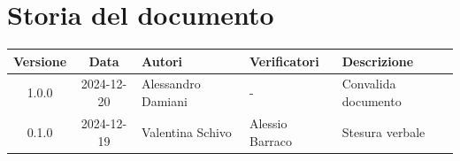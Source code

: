 \section*{Storia del documento}
\begin{tabularx}{\textwidth}{ c c p{2.75cm} p{2.75cm} X }
    \rowcolor{gray!20}\rule{0pt}{0.5cm}\textbf{Versione} & \textbf{Data} & \textbf{Autori} & \textbf{Verificatori} & \textbf{Descrizione} \\[0.7ex]
    \hline
    \rule{0pt}{0.5cm}1.0.0 & 2024-12-20 & Alessandro Damiani & - & Convalida documento\\[0.7ex]
    \hline
    \rule{0pt}{0.5cm}0.1.0 & 2024-12-19 & Valentina Schivo & Alessio Barraco & Stesura verbale\\[0.7ex]
\end{tabularx} 